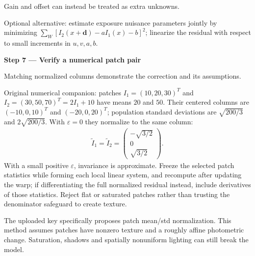 \documentclass[letterpaper,11pt,english,openany,oneside]{jupyterBook}
\begin{document}
\sphinxAtStartPar
{} Gain and offset can instead be treated as extra unknowns.

\sphinxAtStartPar
Optional alternative: estimate exposure nuisance parameters jointly by minimizing {\color{QuizMathBlue} \(\sum_W[I_2(x+\mathbf d)-aI_1(x)-b]^2\)}; linearize the residual with respect to small increments in {\color{QuizMathBlue} \(u,v,a,b\)}.

\par

\par\medskip{}
{\color{QuizStepRed}\bfseries Step 7 — Verify a numerical patch pair}\par\smallskip

\sphinxAtStartPar
{} Matching normalized columns demonstrate the correction and its assumptions.

\sphinxAtStartPar
Original numerical companion: patches {\color{QuizMathBlue} \(I_1=(10,20,30)^T\)} and {\color{QuizMathBlue} \(I_2=(30,50,70)^T=2I_1+10\)} have means {\color{QuizMathBlue} \(20\)} and {\color{QuizMathBlue} \(50\)}. Their centered columns are {\color{QuizMathBlue} \((-10,0,10)^T\)} and {\color{QuizMathBlue} \((-20,0,20)^T\)}; population standard deviations are {\color{QuizMathBlue} \(\sqrt{200/3}\)} and {\color{QuizMathBlue} \(2\sqrt{200/3}\)}. With {\color{QuizMathBlue} \(\varepsilon=0\)} they normalize to the same column:
{\color{QuizMathBlue} \begin{equation*}
\begin{split}
\widetilde I_1=\widetilde I_2=\begin{pmatrix}-\sqrt{3/2}\\0\\\sqrt{3/2}\end{pmatrix}.
\end{split}
\end{equation*}}
\sphinxAtStartPar
With a small positive {\color{QuizMathBlue} \(\varepsilon\)}, invariance is approximate. Freeze the selected patch statistics while forming each local linear system, and recompute after updating the warp; if differentiating the full normalized residual instead, include derivatives of those statistics. Reject flat or saturated patches rather than trusting the denominator safeguard to create texture.

\par

\sphinxAtStartPar
{} The uploaded key specifically proposes patch mean/std normalization. This method assumes patches have nonzero texture and a roughly affine photometric change. Saturation, shadows and spatially nonuniform lighting can still break the model.
\end{document}
